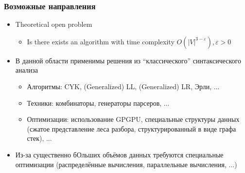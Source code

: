 \documentclass[xcolor=table,aspectratio=169]{beamer}
\begin{document}
\begin{frame}[fragile]
  \transwipe[direction=90]
  \frametitle{Возможные направления}
  \begin{itemize}
  \item Theoretical open problem
    \begin{itemize}
        \item Is there exists an algorithm with time complexity $O(|V|^{3-\varepsilon}), \varepsilon > 0$
    \end{itemize}
  \item В данной области применимы решения из ``классического'' синтаксического анализа
    \begin{itemize}
        \item Алгоритмы: CYK, (Generalized) LL, (Generalized) LR, Эрли, ...
        \item Техники: комбинаторы, генераторы парсеров, ... 
        \item Оптимизации: использование GPGPU, специальные структуры данных (сжатое представление леса разбора, структурированный в виде графа стек), ...
    \end{itemize}
  \item Из-за существенно бОльших объёмов данных требуются специальные оптимизации (распределённые вычисления, параллельные вычисления, ...)
  \end{itemize}

\end{frame}
\end{document}
